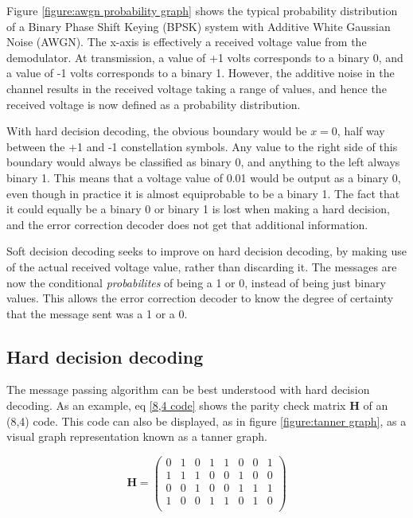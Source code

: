 \documentclass[11pt]{article}
\numberwithin{equation}{subsection}
\begin{document}
Figure \ref{figure:awgn probability graph} shows the typical probability distribution of a Binary Phase Shift Keying (BPSK) system with Additive White Gaussian Noise (AWGN). The x-axis is effectively a received voltage value from the demodulator. At transmission, a value of +1 volts corresponds to a binary 0, and a value of -1 volts corresponds to a binary 1. However, the additive noise in the channel results in the received voltage taking a range of values, and hence the received voltage is now defined as a probability distribution.

With hard decision decoding, the obvious boundary would be $x = 0$, half way between the +1 and -1 constellation symbols. Any value to the right side of this boundary would always be classified as binary 0, and anything to the left always binary 1. This means that a voltage value of 0.01 would be output as a binary 0, even though in practice it is almost equiprobable to be a binary 1. The fact that it could equally be a binary 0 or binary 1 is lost when making a hard decision, and the error correction decoder does not get that additional information.

Soft decision decoding seeks to improve on hard decision decoding, by making use of the actual received voltage value, rather than discarding it. The messages are now the conditional \textit{probabilites} of being a 1 or 0, instead of being just binary values. This allows the error correction decoder to know the degree of certainty that the message sent was a 1 or a 0.

\subsection{Hard decision decoding}
The message passing algorithm can be best understood with hard decision decoding. As an example, eq \ref{8,4 code} shows the parity check matrix $\mathbf{H}$ of an (8,4) code. This code can also be displayed, as in figure \ref{figure:tanner graph}, as a visual graph representation known as a tanner graph. \cite{leiner2005ldpc}

\begin{equation} \label{8,4 code} 
\mathbf{H} = 
\left(
\begin{array}{cccccccc}
  0 & 1 & 0 & 1 & 1 & 0 & 0 & 1 \\
  1 & 1 & 1 & 0 & 0 & 1 & 0 & 0 \\
  0 & 0 & 1 & 0 & 0 & 1 & 1 & 1 \\
  1 & 0 & 0 & 1 & 1 & 0 & 1 & 0 \\
\end{array}
\right)
\end{equation}
\end{document}
